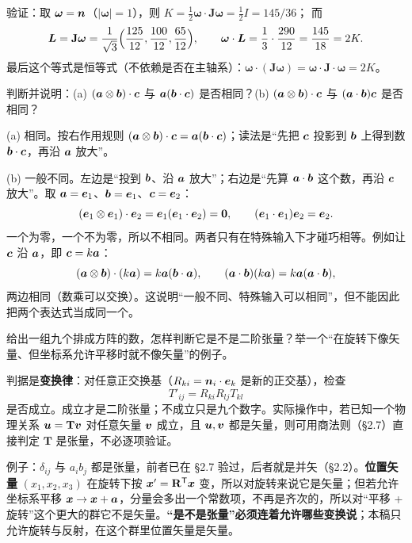 \documentclass[11pt]{ctexart}
\newcommand{\ten}[1]{\mathbf{#1}}
\begin{document}
验证：取 $\boldsymbol\omega=\boldsymbol{n}$（$|\boldsymbol\omega|=1$），则 $K=\frac12\boldsymbol\omega\cdot\ten J\boldsymbol\omega=\frac12I=145/36$；
而
\[
\vect L=\ten J\boldsymbol\omega=\frac{1}{\sqrt3}\Bigl(\frac{125}{12},\frac{100}{12},\frac{65}{12}\Bigr),
\qquad
\boldsymbol\omega\cdot\vect L=\frac{1}{3}\cdot\frac{290}{12}=\frac{145}{18}=2K .
\]
最后这个等式是恒等式（不依赖是否在主轴系）：$\boldsymbol\omega\cdot(\ten J\boldsymbol\omega)=\boldsymbol\omega\cdot\ten J\cdot\boldsymbol\omega=2K$。

{判断并说明：(a) $(\boldsymbol{a}\otimes\boldsymbol{b})\cdot\boldsymbol{c}$ 与 $\boldsymbol{a}(\boldsymbol{b}\cdot\boldsymbol{c})$ 是否相同？(b) $(\boldsymbol{a}\otimes\boldsymbol{b})\cdot\boldsymbol{c}$ 与 $(\boldsymbol{a}\cdot\boldsymbol{b})\boldsymbol{c}$ 是否相同？}

(a) 相同。按右作用规则 $(\boldsymbol{a}\otimes\boldsymbol{b})\cdot\boldsymbol{c}=\boldsymbol{a}(\boldsymbol{b}\cdot\boldsymbol{c})$；读法是“先把 $\boldsymbol{c}$ 投影到 $\boldsymbol{b}$ 上得到数 $\boldsymbol{b}\cdot\boldsymbol{c}$，再沿 $\boldsymbol{a}$ 放大”。

(b) 一般不同。左边是“投到 $\boldsymbol{b}$、沿 $\boldsymbol{a}$ 放大”；右边是“先算 $\boldsymbol{a}\cdot\boldsymbol{b}$ 这个数，再沿 $\boldsymbol{c}$ 放大”。取 $\boldsymbol{a}=\boldsymbol{e}_1$、$\boldsymbol{b}=\boldsymbol{e}_1$、$\boldsymbol{c}=\boldsymbol{e}_2$：
\[
(\boldsymbol{e}_1\otimes\boldsymbol{e}_1)\cdot\boldsymbol{e}_2=\boldsymbol{e}_1(\boldsymbol{e}_1\cdot\boldsymbol{e}_2)=\boldsymbol{0},
\qquad
(\boldsymbol{e}_1\cdot\boldsymbol{e}_1)\boldsymbol{e}_2=\boldsymbol{e}_2 .
\]
一个为零，一个不为零，所以不相同。两者只有在特殊输入下才碰巧相等。例如让 $\boldsymbol{c}$ 沿 $\boldsymbol{a}$，即 $\boldsymbol{c}=k\boldsymbol{a}$：
\[
(\boldsymbol{a}\otimes\boldsymbol{b})\cdot(k\boldsymbol{a})=k\boldsymbol{a}(\boldsymbol{b}\cdot\boldsymbol{a}),
\qquad
(\boldsymbol{a}\cdot\boldsymbol{b})(k\boldsymbol{a})=k\boldsymbol{a}(\boldsymbol{a}\cdot\boldsymbol{b}),
\]
两边相同（数乘可以交换）。这说明“一般不同、特殊输入可以相同”，但不能因此把两个表达式当成同一个。

{给出一组九个排成方阵的数，怎样判断它是不是二阶张量？举一个“在旋转下像矢量、但坐标系允许平移时就不像矢量”的例子。}

判据是\textbf{变换律}：对任意正交换基（$R_{ki}=\boldsymbol{n}_i\cdot\boldsymbol{e}_k$ 是新的正交基），检查
\[
T'_{ij}=R_{ki}R_{lj}T_{kl}
\]
是否成立。成立才是二阶张量；不成立只是九个数字。实际操作中，若已知一个物理关系 $\vect u=\ten T\vect v$ 对任意矢量 $\boldsymbol{v}$ 成立，且 $\boldsymbol{u},\boldsymbol{v}$ 都是矢量，则可用商法则（\S2.7）直接判定 $\ten T$ 是张量，不必逐项验证。

例子：$\delta_{ij}$ 与 $a_ib_j$ 都是张量，前者已在 \S2.7 验过，后者就是并矢（\S2.2）。\textbf{位置矢量} $(x_1,x_2,x_3)$ 在旋转下按 $\vect x'=\ten R^{\mathsf T}\vect x$ 变，所以对旋转来说它是矢量；但若允许坐标系平移 $\boldsymbol{x}\to\boldsymbol{x}+\boldsymbol{a}$，分量会多出一个常数项，不再是齐次的，所以对“平移 + 旋转”这个更大的群它不是矢量。\textbf{“是不是张量”必须连着允许哪些变换说}；本稿只允许旋转与反射，在这个群里位置矢量是矢量。
\end{document}
